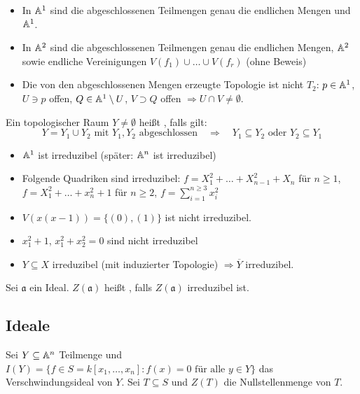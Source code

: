 \begin{bsp}
	\begin{itemize}
		\item In $\mathbb{A}^1$ sind die abgeschlossenen Teilmengen genau die endlichen Mengen und $\mathbb{A}^1$.
		\item In $\mathbb{A}^2$ sind die abgeschlossenen Teilmengen genau die endlichen Mengen, $\mathbb{A}^2$ sowie endliche Vereinigungen $V(f_1) \cup \dots \cup V(f_r)$ (ohne Beweis)
		\item Die von den abgeschlossenen Mengen erzeugte Topologie ist nicht $T_2$: $p \in \mathbb{A}^1$, $U \ni p$ offen, $Q \in \mathbb{A}^1 \setminus U$, $V \supset Q$ offen $\Rightarrow U \cap V \neq \emptyset$.
	\end{itemize}
\end{bsp}
	
\begin{defn}
	Ein topologischer Raum $Y \neq \emptyset$ heißt , falls gilt:
	\[Y = Y_1 \cup Y_2 \text{ mit } Y_1,Y_2 \text{ abgeschlossen} \quad \Rightarrow \quad Y_1 \subseteq Y_2 \text{ oder } Y_2 \subseteq Y_1 \]
\end{defn}

\begin{bsp}
	\begin{itemize}
		\item $\mathbb{A}^1$ ist irreduzibel (später: $\mathbb{A}^n$ ist irreduzibel)
		\item Folgende Quadriken sind irreduzibel: $f = X_1^2 + \dots + X_{n-1}^2 + X_n$ für $n \geq 1$, $f = X_1^2+ \dots + x_n^2 + 1$ für $n \geq 2$, $f = \sum_{i=1}^{n \geq 3} x_i^2$
		\item $V(x(x-1)) = \{ (0),(1) \}$ ist nicht irreduzibel.
		\item $x_1^2 + 1$, $x_1^2+x_2^2 = 0$ sind nicht irreduzibel
		\item $Y \subseteq X$ irreduzibel (mit induzierter Topologie) $\Rightarrow \overline{Y}$ irreduzibel.
	\end{itemize}
\end{bsp}

\begin{defn}
	Sei $\mathfrak{a}$ ein Ideal. $Z(\mathfrak{a})$ heißt , falls $Z(\mathfrak{a})$ irreduzibel ist.
\end{defn}

\subsection{Ideale}	\label{sub_1.3}
	Sei $Y \subseteq \mathbb{A}^n$ Teilmenge und $I(Y) = \{f \in S = k[x_1,\dots,x_n] : f(x) = 0 \text{ für alle } y \in Y\}$ das Verschwindungsideal von $Y$. Sei $T \subseteq S$ und $Z(T)$ die Nullstellenmenge von $T$.
	
